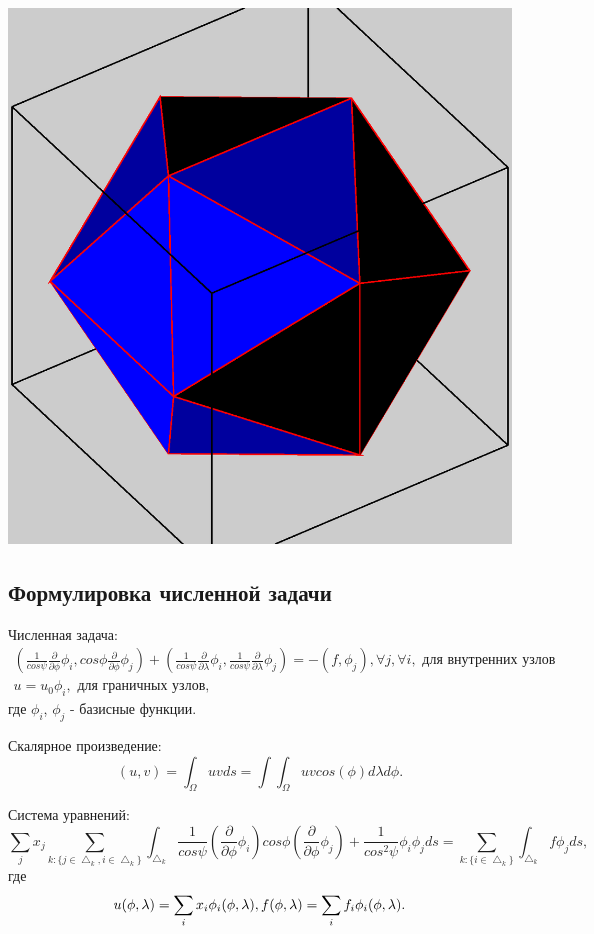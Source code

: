 \documentclass[a4paper,article]{article}
\begin{document}
\includegraphics[scale=0.5]{icosahedron.eps}

\subsection{Формулировка численной задачи}
Численная задача:
\begin{equation*}
\begin{split}
(\frac{1}{cos\psi}\frac{\partial}{\partial \phi} \phi_i, cos\phi \frac{\partial}{\partial \phi} \phi_j)
+(\frac{1}{cos\psi}\frac{\partial}{\partial \lambda}\phi_i, \frac{1}{cos\psi}\frac{\partial}{\partial \lambda}\phi_j ) = -(f, \phi_j), \forall j, \forall i, \text{ для внутренних узлов } \\
u = u_0 \phi_i, \text { для граничных узлов, }
\end{split}
\end{equation*}
где $\phi_i$, $\phi_j$ - базисные функции.

Скалярное произведение:
\begin{equation*}
(u, v) = \int_\Omega u v ds = \int\int_\Omega u v cos(\phi)d\lambda d\phi.
\end{equation*}

Система уравнений:
\begin{equation*}
\sum_j x_j \sum_{k: \{j\in\bigtriangleup_k, i\in\bigtriangleup_k\}}\int_{\bigtriangleup_k}\frac{1}{cos\psi}(\frac{\partial}{\partial \phi} \phi_i) cos\phi (\frac{\partial}{\partial \phi} \phi_j)+\frac{1}{cos^2\psi}\phi_i\phi_j ds = \sum_{k:\{i\in\bigtriangleup_k\}}\int_{\bigtriangleup_k}f \phi_j ds,
\end{equation*}
где
\begin{equation*}
u(\phi,\lambda)=\sum_i x_i \phi_i(\phi, \lambda),\\
f(\phi,\lambda)=\sum_i f_i \phi_i(\phi, \lambda).
\end{equation*}
\end{document}
